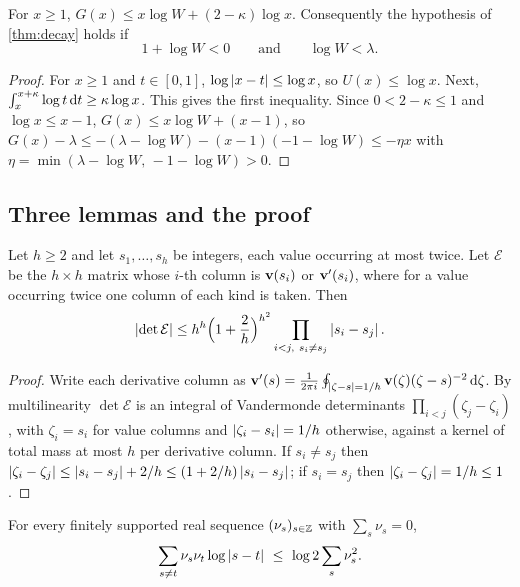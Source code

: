 \begin{lemma}\label{lem:tail}
For $x\ge1$, $G(x)\le x\log W+(2-\kappa)\log x$. Consequently the hypothesis of \cref{thm:decay}
holds if
\[
  1+\log W<0\qquad\text{and}\qquad\log W<\lambda .
\]
\end{lemma}

\begin{proof}
For $x\ge1$ and $t\in[0,1]$, $\log\left\lvert x-t\right\rvert\le\log x$, so $U(x)\le\log x$. Next,
$\int_x^{x+\kappa}\log t\,\mathrm{d} t\ge\kappa\log x$. This gives the first inequality. Since
$0<2-\kappa\le1$ and $\log x\le x-1$, $G(x)\le x\log W+(x-1)$, so
$G(x)-\lambda\le-(\lambda-\log W)-(x-1)(-1-\log W)\le-\eta x$ with
$\eta=\min(\lambda-\log W,\,-1-\log W)>0$.
\end{proof}

\subsection{Three lemmas and the proof}\label{subsec:decay-lemmas}

\begin{lemma}\label{lem:derivative-minors}
Let $h\ge2$ and let $s_1,\dots,s_h$ be integers, each value occurring at most twice. Let
$\mathcal E$ be the $h\times h$ matrix whose $i$-th column is $\mathbf{v}(s_i)$ or $\mathbf{v}'(s_i)$, where
for a value occurring twice one column of each kind is taken. Then
\[
  \left\lvert \det\mathcal E\right\rvert\le h^h\Bigl(1+\frac2h\Bigr)^{h^2}\prod_{i<j,\ s_i\ne s_j}\left\lvert s_i-s_j\right\rvert.
\]
\end{lemma}

\begin{proof}
Write each derivative column as $\mathbf{v}'(s)=\frac1{2\pi i}\oint_{\left\lvert \zeta-s\right\rvert=1/h}
\mathbf{v}(\zeta)(\zeta-s)^{-2}\,\mathrm{d}\zeta$. By multilinearity $\det\mathcal E$ is an integral of
Vandermonde determinants $\prod_{i<j}(\zeta_j-\zeta_i)$, with $\zeta_i=s_i$ for value columns
and $\left\lvert \zeta_i-s_i\right\rvert=1/h$ otherwise, against a kernel of total mass at most $h$ per derivative
column. If $s_i\ne s_j$ then $\left\lvert \zeta_i-\zeta_j\right\rvert\le\left\lvert s_i-s_j\right\rvert+2/h\le(1+2/h)\left\lvert s_i-s_j\right\rvert$;
if $s_i=s_j$ then $\left\lvert \zeta_i-\zeta_j\right\rvert=1/h\le1$.
\end{proof}

\begin{lemma}\label{lem:polya}
For every finitely supported real sequence $(\nu_s)_{s\in\mathbb{Z}}$ with $\sum_s\nu_s=0$,
\[
  \sum_{s\ne t}\nu_s\nu_t\log\abs{s-t}\ \le\ \log2\sum_s\nu_s^2 .
\]
\end{lemma}

